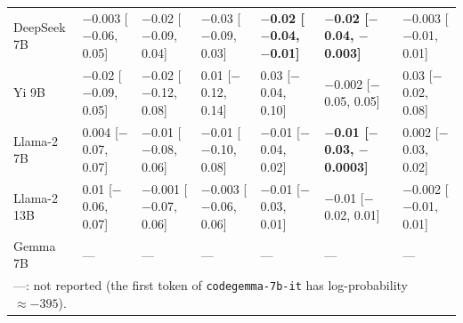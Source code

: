 \begin{tabular}{lllllll}
DeepSeek 7B & $-$0.003 [$-$0.06, 0.05] & $-$0.02 [$-$0.09, 0.04] & $-$0.03 [$-$0.09, 0.03] & \textbf{$-$0.02 [$-$0.04, $-$0.01]} & \textbf{$-$0.02 [$-$0.04, $-$0.003]} & $-$0.003 [$-$0.01, 0.01] \\
Yi 9B & $-$0.02 [$-$0.09, 0.05] & $-$0.02 [$-$0.12, 0.08] & 0.01 [$-$0.12, 0.14] & 0.03 [$-$0.04, 0.10] & $-$0.002 [$-$0.05, 0.05] & 0.03 [$-$0.02, 0.08] \\
Llama-2 7B & 0.004 [$-$0.07, 0.07] & $-$0.01 [$-$0.08, 0.06] & $-$0.01 [$-$0.10, 0.08] & $-$0.01 [$-$0.04, 0.02] & \textbf{$-$0.01 [$-$0.03, $-$0.0003]} & 0.002 [$-$0.03, 0.02] \\
Llama-2 13B & 0.01 [$-$0.06, 0.07] & $-$0.001 [$-$0.07, 0.06] & $-$0.003 [$-$0.06, 0.06] & $-$0.01 [$-$0.03, 0.01] & $-$0.01 [$-$0.02, 0.01] & $-$0.002 [$-$0.01, 0.01] \\
Gemma 7B & --- & --- & --- & --- & --- & --- \\
\multicolumn{7}{l}{\footnotesize ---: not reported (the first token of \texttt{codegemma-7b-it} has log-probability $\approx -395$).} \\
\bottomrule
\end{tabular}
